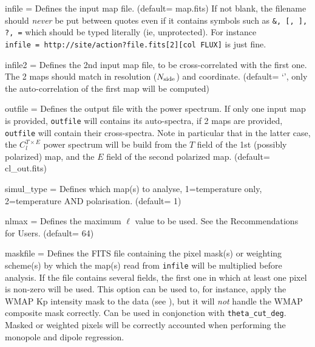 \begin{qualifiers}
  \begin{qulist}{} %
    \item[{infile = }]%
 Defines the input map file. 
	(default= map.fits)
	If not blank, the filename should {\em never} be put between quotes even if it contains
symbols such as {\tt \&, [, ], ?, =} which should be typed literally (ie, unprotected). For instance
 {\tt infile~=~http://site/action?file.fits[2][col FLUX]} is just fine.
    \item[{infile2 = }]%
 Defines the 2nd input map file, to be cross-correlated with
	the first one. The 2 maps should match in resolution ($N_{\mathrm{side}}$) and coordinate.
	(default= `', only the auto-correlation of the first map will be computed)
    \item[{outfile = }]%
 Defines the output file with the power spectrum. If only
      one input map is provided, {\tt outfile} will contains its auto-spectra,
      if 2 maps are provided, {\tt outfile} will contain their
      cross-spectra. Note in particular that in the latter case, the $C^{T\times E}_l$ power
      spectrum will be build from the $T$ field of the 1st (possibly polarized) map, and the $E$
      field of the second polarized map.
(default= cl\_out.fits)
     \item[{simul\_type = }]%
 Defines which map(s) to analyse, 1=temperature only, 2=temperature AND polarisation.
(default= 1)
     \item[{nlmax = }]%
 Defines the maximum $\ell$ value 
to be used. See the Recommendations for Users. 
(default= 64)
 \item[{maskfile = }]%
 Defines the FITS file containing the pixel mask(s) or
 weighting scheme(s) by which the map(s) read from {\tt infile} will be
 multiplied before analysis. If the file contains several fields, the first
one in which at least one pixel is non-zero will be used. This option can be
 used to, for instance, apply
the WMAP Kp intensity mask to the data (see
), 
but it will {\em not} handle the WMAP composite mask correctly.
Can be used in conjonction with {\tt theta\_cut\_deg}. Masked or weighted pixels
 will be correctly accounted when performing the monopole and dipole regression.\\

\end{qulist}
\end{qualifiers}
